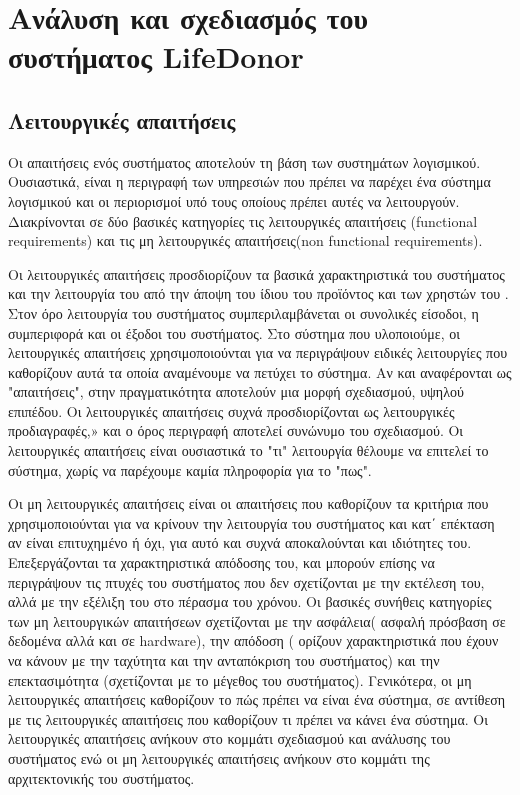 \graphicspath{ {Figures/system_analysis/} }

\chapter{Ανάλυση και σχεδιασμός του συστήματος LifeDonor}\label{ch:Analysis of LifeDonor}
\section{Λειτουργικές απαιτήσεις}

	Οι απαιτήσεις ενός συστήματος αποτελούν τη βάση των συστημάτων λογισμικού. Ουσιαστικά, είναι η περιγραφή των υπηρεσιών που πρέπει να παρέχει ένα σύστημα λογισμικού και οι περιορισμοί υπό τους οποίους πρέπει αυτές να λειτουργούν. Διακρίνονται σε δύο βασικές κατηγορίες τις λειτουργικές απαιτήσεις (functional requirements) και τις μη λειτουργικές απαιτήσεις(non functional requirements). 
	
	Οι λειτουργικές απαιτήσεις προσδιορίζουν τα βασικά χαρακτηριστικά του συστήματος και την λειτουργία του από την άποψη του ίδιου του προϊόντος και των χρηστών του . Στον όρο λειτουργία του συστήματος συμπεριλαμβάνεται οι συνολικές είσοδοι, η συμπεριφορά και οι έξοδοι του συστήματος. Στο σύστημα που υλοποιούμε, οι λειτουργικές απαιτήσεις χρησιμοποιούνται για να περιγράψουν ειδικές λειτουργίες που καθορίζουν αυτά τα οποία αναμένουμε να πετύχει το σύστημα. Αν και αναφέρονται ως "απαιτήσεις", στην πραγματικότητα αποτελούν μια μορφή σχεδιασμού, υψηλού επιπέδου. Οι λειτουργικές απαιτήσεις συχνά προσδιορίζονται ως λειτουργικές προδιαγραφές,» και ο όρος περιγραφή αποτελεί συνώνυμο του σχεδιασμού. Οι λειτουργικές απαιτήσεις είναι ουσιαστικά το "τι" λειτουργία θέλουμε να επιτελεί το σύστημα, χωρίς να παρέχουμε καμία πληροφορία για το "πως".
	
	Οι μη λειτουργικές απαιτήσεις είναι οι απαιτήσεις που καθορίζουν τα κριτήρια που χρησιμοποιούνται για να κρίνουν την λειτουργία του συστήματος και κατ΄ επέκταση  αν είναι επιτυχημένο ή όχι, για αυτό και συχνά αποκαλούνται και ιδιότητες του. Επεξεργάζονται τα χαρακτηριστικά απόδοσης του, και μπορούν επίσης να περιγράψουν τις πτυχές του συστήματος που δεν σχετίζονται με την εκτέλεση του, αλλά με την εξέλιξη του στο πέρασμα του χρόνου. Οι βασικές συνήθεις κατηγορίες των μη λειτουργικών απαιτήσεων σχετίζονται με την ασφάλεια( ασφαλή πρόσβαση σε δεδομένα αλλά και σε hardware), την απόδοση ( ορίζουν χαρακτηριστικά που έχουν να κάνουν με την ταχύτητα και την ανταπόκριση του συστήματος) και την επεκτασιμότητα (σχετίζονται με το μέγεθος του συστήματος). Γενικότερα, οι μη λειτουργικές απαιτήσεις καθορίζουν το πώς πρέπει να είναι ένα σύστημα, σε αντίθεση με τις λειτουργικές απαιτήσεις που καθορίζουν τι πρέπει να κάνει ένα σύστημα. Οι λειτουργικές απαιτήσεις ανήκουν στο κομμάτι σχεδιασμού και ανάλυσης του συστήματος ενώ οι μη λειτουργικές απαιτήσεις ανήκουν στο κομμάτι της αρχιτεκτονικής του συστήματος.
	
